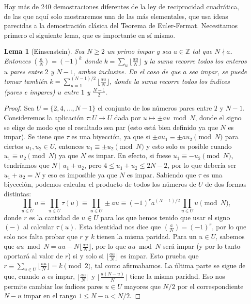 \documentclass[a4paper, 11pt]{article}
\newcommand{\ZZ}{\mathbb{Z}}
\theoremstyle{plain}
\newtheorem{lema}[teor]{Lema}
\theoremstyle{definition}
\begin{document}
Hay más de 240 demostraciones diferentes de la ley de reciprocidad
cuadrática, de las que aquí solo mostraremos una de las más elementales,
que usa ideas parecidas a la demostración clásica del
Teorema de Euler-Fermat. Necesitamos primero el
siguiente lema, que es importante en sí mismo.

\begin{lema}[Einsenstein]\label{lema-eins}
Sea $N\geq2$ un primo impar y sea $a\in\ZZ$ tal que $N\nmid a$. Entonces
$\left(\frac{a}{N}\right)=(-1)^k$ donde $k=\sum_u\lfloor\frac{au}{N}\rfloor$
y la suma recorre todos los enteros $u$ pares entre $2$ y $N-1$, ambos
inclusive. En el caso de que $a$ sea impar, se puede tomar también
$k=\sum_{u=1}^{(N-1)/2}\lfloor\frac{au}N\rfloor$, donde la suma recorre
todos los índices (pares e impares) $u$ entre $1$ y $\frac{N-1}2$.
\end{lema}
\begin{proof}
Sea $U=\{2,4,\ldots,N-1\}$ el conjunto de los números pares entre $2$ y $N-1$.
Consideremos la aplicación $\tau:U\rightarrow U$ dada por
$u\mapsto \pm au \bmod{N}$, donde el signo se elige de modo que el resultado
sea par (esto está bien definido ya que $N$ es impar). Se tiene que $\tau$ es
una biyección, ya que si $\pm au_1\equiv\pm au_2\pmod{N}$ para ciertos
$u_1,u_2\in U$, entonces $u_1\equiv\pm u_2\pmod{N}$ y esto solo es posible
cuando $u_1\equiv u_2\pmod{N}$ ya que $N$ es impar. En efecto, si fuese
$u_1\equiv -u_2\pmod{N}$, tendríamos que $N\mid u_1+u_2$, pero
$4\leq u_1+u_2\leq 2N-2$, por lo que debería ser $u_1+u_2=N$ y eso es imposible
ya que $N$ es impar. Sabiendo que $\tau$ es una biyección, podemos calcular el
producto de todos los números de $U$ de dos formas distintas:
\[
   \prod_{u\in U}u\equiv\prod_{u\in U}\tau(u)\equiv\prod_{u\in U}\pm au
   \equiv (-1)^ra^{(N-1)/2}\prod_{u\in U}u\pmod{N},
\]
donde $r$ es la cantidad de $u\in U$ para los que hemos tenido que usar el
signo $(-)$ al calcular $\tau(u)$. Esta identidad nos dice que
$\left(\frac{a}{N}\right)=(-1)^r$, por lo que solo nos falta probar que
$r$ y $k$ tienen la misma paridad. Para un $u\in U$, sabemos que
$au\bmod{N}=au-N\lfloor\frac{au}{N}\rfloor$, por lo que $au\bmod{N}$ será impar
(y por lo tanto aportará al valor de $r$) si y solo si
$\lfloor\frac{au}{N}\rfloor$ es impar. Esto prueba que
$r\equiv\sum_{u\in U}\lfloor\frac{au}{N}\rfloor=k\pmod{2}$, tal como afirmabamos.
La última parte se sigue de que, cuando $a$ es impar, $\lfloor\frac{au}{N}\rfloor$
y $\lfloor\frac{a(N-u)}{N}\rfloor$ tiene la misma paridad. Eso nos permite cambiar
los índices pares $u\in U$ mayores que $N/2$ por el correspondiente $N-u$ impar
en el rango $1\leq N-u<N/2$.
\end{proof}
\end{document}
